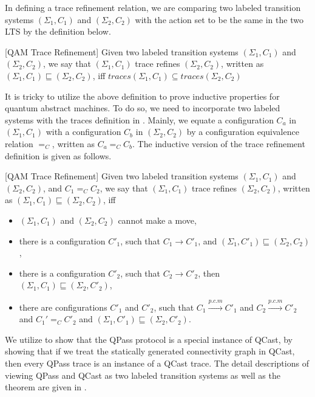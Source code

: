 In defining a trace refinement relation, we are comparing two labeled transition systems $(\Sigma_1,C_1)$ and $(\Sigma_2,C_2)$ with the action set to be the same in the two LTS by the definition below.

\begin{definition}\label{def:traceeq}\rm[QAM Trace Refinement]
Given two labeled transition systems $(\Sigma_1,C_1)$ and $(\Sigma_2,C_2)$, we say that $(\Sigma_1,C_1)$ trace refines $(\Sigma_2,C_2)$, written as $(\Sigma_1,C_1) \sqsubseteq (\Sigma_2,C_2)$, iff $traces(\Sigma_1,C_1)\subseteq traces(\Sigma_2,C_2)$

\end{definition}

It is tricky to utilize the above definition to prove inductive properties for quantum abstract machines. To do so, we need to incorporate
two labeled systems with the traces definition in .
Mainly, we equate a configuration $C_a$ in $(\Sigma_1,C_1)$ with a configuration $C_b$ in $(\Sigma_2,C_2)$ by a configuration equivalence relation $=_C$, written as $C_a =_C C_b$. The inductive version of the trace refinement definition is given as follows.

\begin{definition}\label{def:traceeq1}\rm[QAM Trace Refinement]
Given two labeled transition systems $(\Sigma_1,C_1)$ and $(\Sigma_2,C_2)$, and $C_1 =_C C_2$, we say that $(\Sigma_1,C_1)$ trace refines $(\Sigma_2,C_2)$, written as $(\Sigma_1,C_1) \sqsubseteq (\Sigma_2,C_2)$, iff

\begin{itemize}
\item $(\Sigma_1,C_1)$ and $(\Sigma_2,C_2)$ cannot make a move,
\item there is a configuration $C'_1$, such that $C_1\longrightarrow C'_1$, and $(\Sigma_1,C'_1) \sqsubseteq (\Sigma_2,C_2)$,
\item there is a configuration $C'_2$, such that $C_2\longrightarrow C'_2$, then $(\Sigma_1,C_1) \sqsubseteq (\Sigma_2,C'_2)$,
\item there are configurations $C'_1$ and $C'_2$, such that $C_1\xrightarrow{p.c.m}C'_1$ and $C_2\xrightarrow{p.c.m}C'_2$ and $C_1' =_C C'_2$ and $(\Sigma_1,C'_1) \sqsubseteq (\Sigma_2,C'_2)$.
\end{itemize}
\end{definition}

We utilize  to show that the QPass protocol is a special instance of QCast, by showing that if we treat the statically generated connectivity graph in QCast, then every QPass trace is an instance of a QCast trace. The detail descriptions of viewing QPass and QCast as two labeled transition systems as well as the theorem are given in .



